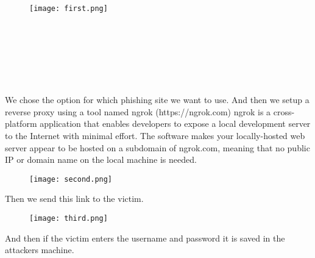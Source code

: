 \documentclass[a4paper,12pt]{article}
\begin{document}
\begin{figure}[htbp]
\texttt{[image: first.png]}
\end{figure}
\\
\\
\\
\\
\\
\\
We chose the option for which phishing site we want to use. 
And then we setup a reverse proxy using a tool named ngrok (https://ngrok.com)
ngrok is a cross-platform application that enables developers to expose a local development server to the Internet with minimal effort. The software makes your locally-hosted web server appear to be hosted on a subdomain of ngrok.com, meaning that no public IP or domain name on the local machine is needed.\\





\begin{figure}[htbp]
\texttt{[image: second.png]}
\end{figure}
Then we send this link to the victim.\\
\begin{figure}[htbp]
\texttt{[image: third.png]}
\end{figure}

And then if the victim enters the username and password it is saved in the attackers machine.\\
\\
\\
\\
\\
\\
\\
\\
\\
\\
\\
\\
\\
\\
\\
\\
\\
\\
\\
\\
\\
\\
\\
\\
\\
\\
\\
\end{document}
